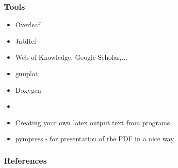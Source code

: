\documentclass[screen, aspectratio=43]{beamer}
\newcommand{\gfcb}[1]{%
    \fcolorbox{white}{gray!10!}{\quad\strut #1\quad}
    } %
\begin{document}
  




\begin{frame}
  \frametitle{Tools}
  \begin{itemize}
      \item Overleaf
      \item JabRef
      \item Web of Knowledge, Google Scholar,...
      \item gnuplot
      \item Doxygen
      \item \detokenize{\newcommand{}}
      \item Creating your own latex output text from programs
      \item pympress - for presentation of the PDF in a nice way
  \end{itemize}
    \note{
  
    }

\end{frame}

\begin{frame}
  \frametitle{References}
  \printbibliography
\end{frame}
\end{document}
